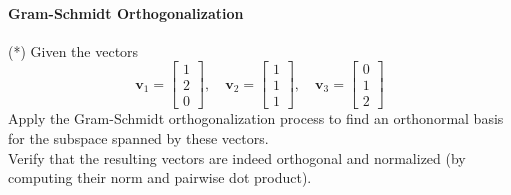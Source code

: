 \documentclass[]{article}
\begin{document}
	
	\paragraph{Gram-Schmidt Orthogonalization}
	(*) Given the vectors
	$$
	\mathbf{v}_1 = \begin{bmatrix}
		1 \\
		2 \\
		0
	\end{bmatrix}, \quad
	\mathbf{v}_2 = \begin{bmatrix}
		1 \\
		1 \\
		1
	\end{bmatrix}, \quad
	\mathbf{v}_3 = \begin{bmatrix}
		0 \\
		1 \\
		2
	\end{bmatrix}
	$$
	Apply the Gram-Schmidt orthogonalization process to find an orthonormal basis for the subspace spanned by these vectors.\\
	Verify that the resulting vectors are indeed orthogonal and normalized (by computing their norm and pairwise dot product).
	
	
\end{document}
